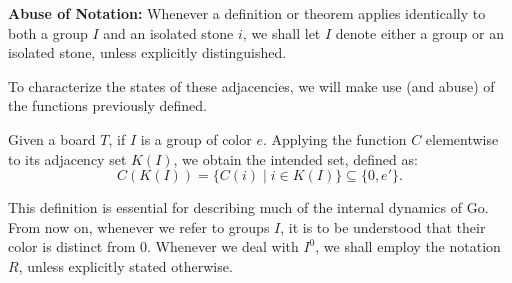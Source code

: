 \textbf{Abuse of Notation:} Whenever a definition or theorem applies identically to both a group $I$ and an isolated stone $i$, we shall let $I$ denote either a group or an isolated stone, unless explicitly distinguished.


To characterize the states of these adjacencies, we will make use (and abuse) of the functions previously defined.

\begin{definition}\label{def_estados}
	Given a board $T$, if $I$ is a group of color $e$. Applying the function $C$ elementwise to its adjacency set $K(I)$, we obtain the intended set, defined as:
	$$C(K(I)) = \{C(i) \mid i \in K(I)\} \subseteq \{0, e'\}.$$
	\end{definition}

This definition is essential for describing much of the internal dynamics of Go. From now on, whenever we refer to groups $I$, it is to be understood that their color is distinct from $0$. Whenever we deal with $I^{0}$, we shall employ the notation $R$, unless explicitly stated otherwise.

